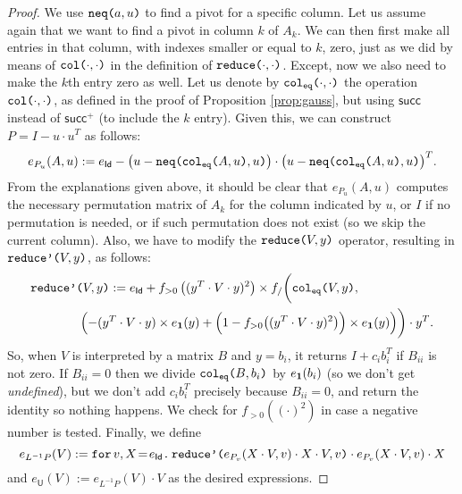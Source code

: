 \begin{proof}
    We use $\nneq{a}{u}$ to find a pivot for a specific column. Let us assume again that we
    want to find a pivot in column $k$ of $A_k$. We can then first make all entries in that column, with indexes smaller or equal to $k$, zero, just as we did by means of $\ccol{\cdot}{\cdot}$ in the
    definition of $\red{\cdot}{\cdot}$. Except, now we also need to make the $k$th entry zero as well.
    Let us denote by $\ccoleq{\cdot}{\cdot}$ the operation $\ccol{\cdot}{\cdot}$, as defined in the proof of Proposition \ref{prop:gauss}, but using $\mathsf{succ}$ instead of $\mathsf{succ}^+$ (to include the $k$ entry). Given this, we can construct $P=I-u\cdot u^T$ as follows:
    $$
    e_{P_u}(A,u) := e_{\mathsf{Id}} - \bigl(u - \nneq{ \ccoleq{A}{u} }{u} \bigr)\cdot \bigl(u - \nneq{ \ccoleq{A}{u} }{u} \bigr)^T.
    $$ 
    From the explanations given above, it should be clear that $e_{P_u}(A,u)$ computes the necessary permutation matrix of $A_k$ for the column indicated by $u$, or $I$
    if no permutation is needed, or if such permutation does not exist (so we skip the current column). Also, we have to modify the $\red{V}{y}$ operator, resulting in $\redd{V}{y}$, as follows:
    \begin{align*}
        &\redd{V}{y}:= e_{\mathsf{Id}}+ f_{>0}\left( ( y^T\cdot V\cdot y)^2 \right)\times f_/\biggl(\ccoleq{V}{y}, \\
        &\hspace{4em}\Bigl(-(y^T\cdot V\cdot y)\times e_{\ones}(y) + \Bigl( 1 - f_{>0}\bigl(( y^T\cdot V\cdot y)^2 \bigr) \Bigr)\times e_{\ones}(y) \Bigr)\biggr)\cdot y^T. 
    \end{align*}
    So, when $V$ is interpreted by a matrix $B$ and $y=b_i$, it returns $I+c_ib_i^T$ if $B_{ii}$ is not zero. 
    If $B_{ii}=0$ then we divide $\ccoleq{B}{b_i}$ by $e_{\ones}(b_i)$ (so we don't get \textit{undefined}), 
    but we don't add $c_ib_i^T$ precisely because $B_{ii}=0$, and return the identity so nothing happens. We check 
    for $f_{>0}((\cdot)^2)$ in case a negative number is tested.
    Finally, we define
    $$
    e_{L^{-1}P}(V):=\initf{e_{\mathsf{Id}}}{v}{X}{\redd{e_{P_v}(X\cdot V,v)\cdot X\cdot V}{v}\cdot e_{P_v}(X\cdot V,v)\cdot X}
    $$
    and $e_{\mathsf{U}}(V):=e_{L^{-1}P}(V)\cdot V$ as the desired expressions.


\end{proof}
